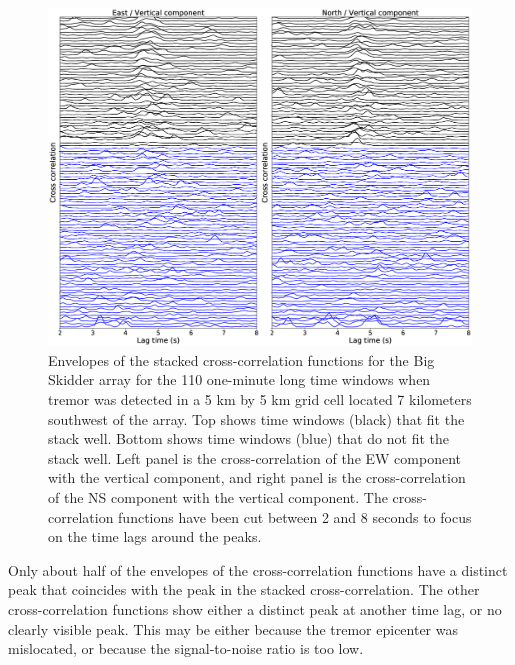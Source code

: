 \documentclass[draft]{agujournal2019}
\begin{document}
\begin{figure}
\noindent\includegraphics[width=\textwidth, trim={0cm 0cm 0cm 0cm},clip]{figures/BS_-05_-05_PWS_PWS_cluster_ccwin.eps}
\caption{Envelopes of the stacked cross-correlation functions for the Big Skidder array for the 110 one-minute long time windows when tremor was detected in a 5 km by 5 km grid cell located 7 kilometers southwest of the array. Top shows time windows (black) that fit the stack well. Bottom shows time windows (blue) that do not fit the stack well. Left panel is the cross-correlation of the EW component with the vertical component, and right panel is the cross-correlation of the NS component with the vertical component. The cross-correlation functions have been cut between 2 and 8 seconds to focus on the time lags around the peaks.}
\label{pngfiguresample}
\end{figure}

Only about half of the envelopes of the cross-correlation functions have a distinct peak that coincides with the peak in the stacked cross-correlation. The other cross-correlation functions show either a distinct peak at another time lag, or no clearly visible peak. This may be either because the tremor epicenter was mislocated, or because the signal-to-noise ratio is too low. \\
\end{document}
